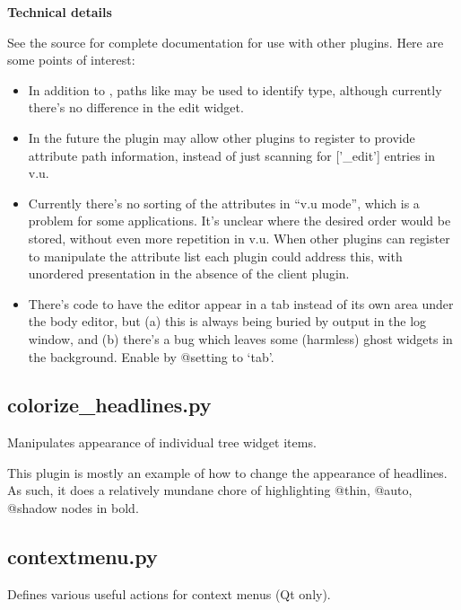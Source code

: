 \documentclass[a4paper,10pt,english]{sphinxmanual}
\begin{document}
\textbf{Technical details}

See the source for complete documentation for use with other
plugins. Here are some points of interest:
\begin{itemize}
\item {} 
In addition to , paths
like  may be used
to identify type, although currently there's no difference in
the edit widget.

\item {} 
In the future the plugin may allow other plugins to register
to provide attribute path information, instead of just
scanning for {[}'\_edit'{]} entries in v.u.

\item {} 
Currently there's no sorting of the attributes in ``v.u mode'', which is
a problem for some applications.  It's unclear where the
desired order would be stored, without even more repetition
in v.u.  When other plugins can register to manipulate the
attribute list each plugin could address this, with unordered
presentation in the absence of the client plugin.

\item {} 
There's code to have the editor appear in a tab instead
of its own area under the body editor, but (a) this is
always being buried by output in the log window, and
(b) there's a bug which leaves some (harmless) ghost
widgets in the background.  Enable by @setting
 to `tab'.

\end{itemize}


\subsection{colorize\_headlines.py}
\label{plugins:colorize-headlines-py}
Manipulates appearance of individual tree widget items.

This plugin is mostly an example of how to change the appearance of headlines.
As such, it does a relatively mundane chore of highlighting @thin, @auto,
@shadow nodes in bold.


\subsection{contextmenu.py}
\label{plugins:contextmenu-py}
Defines various useful actions for context menus (Qt only).
\end{document}
